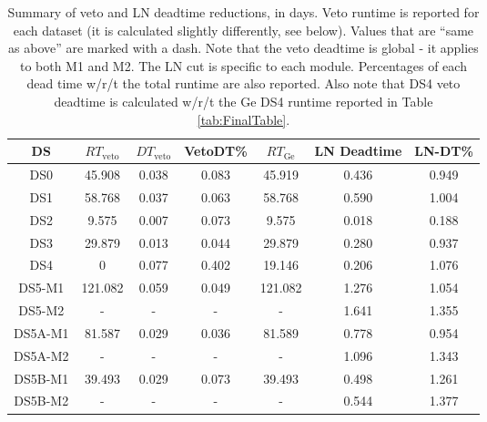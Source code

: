 \documentclass[notitlepage,rmp,aps,10pt]{revtex4-1}
\begin{document}
\begin{table*}[htb]
\begin{center}
\begin{tabular}{|c|c|c|c|c|c|c|}
\hline
DS  &  $RT_{\mathrm{veto}} $ & $DT_{\mathrm{veto}}$ & VetoDT\% & $RT_{\mathrm{Ge}}$ & LN Deadtime & LN-DT\% \\
\hline
DS0 & 45.908               & 0.038                & 0.083    & 45.919           & 0.436       & 0.949 \\
DS1 & 58.768               & 0.037                & 0.063    & 58.768           & 0.590       & 1.004 \\
DS2 & 9.575                & 0.007                & 0.073    & 9.575            & 0.018       & 0.188 \\
DS3 & 29.879               & 0.013                & 0.044    & 29.879           & 0.280       & 0.937 \\
DS4 & 0                    & 0.077                & 0.402    & 19.146           & 0.206       & 1.076 \\
DS5-M1 & 121.082           & 0.059                & 0.049    & 121.082          & 1.276       & 1.054 \\
DS5-M2 & -                 & -                    & -        & -                & 1.641       & 1.355 \\
DS5A-M1 & 81.587           & 0.029                & 0.036    & 81.589           & 0.778       & 0.954 \\
DS5A-M2 & -                & -                    & -        & -                & 1.096       & 1.343 \\
DS5B-M1 & 39.493           & 0.029                & 0.073    & 39.493           & 0.498       & 1.261 \\
DS5B-M2 & -                & -                    & -        & -                & 0.544       & 1.377 \\
\hline
\end{tabular}
\caption{Summary of veto and LN deadtime reductions, in days.  Veto runtime is reported for each dataset (it is calculated slightly differently, see below).  Values that are ``same as above'' are marked with a dash.  Note that the veto deadtime is global - it applies to both M1 and M2.  The LN cut is specific to each module.  Percentages of each dead time w/r/t the total runtime are also reported.  Also note that DS4 veto deadtime is calculated w/r/t the Ge DS4 runtime reported in Table \ref{tab:FinalTable}.}
\label{tab:ClintsTable}
\end{center}
\end{table*}
\end{document}
